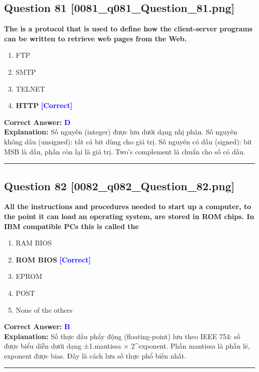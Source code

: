 \documentclass[11pt,a4paper]{article}
\begin{document}
\begin{minipage}{\textwidth}
\subsection*{Question 81 \quad \footnotesize{[0081\_q081\_Question\_81.png]}}
\noindent \textbf{The is a protocol that is used to define how the client-server programs can be written to retrieve web pages from the Web.}

\begin{enumerate}[label=\Alph*.]
    \item FTP
    \item SMTP
    \item TELNET
    \item \textbf{HTTP} \hfill \textcolor{blue}{\textbf{[Correct]}}
\end{enumerate}

\noindent \textbf{Correct Answer:} \textcolor{blue}{\textbf{D}} \\[2pt]
\noindent \textbf{Explanation:} Số nguyên (integer) được lưu dưới dạng nhị phân. Số nguyên không dấu (unsigned): tất cả bit dùng cho giá trị. Số nguyên có dấu (signed): bit MSB là dấu, phần còn lại là giá trị. Two's complement là chuẩn cho số có dấu.

\par\vspace{0.3cm}
\hrule
\vspace{0.3cm}
\end{minipage}

\begin{minipage}{\textwidth}
\subsection*{Question 82 \quad \footnotesize{[0082\_q082\_Question\_82.png]}}
\noindent \textbf{All the instructions and procedures needed to start up a computer, to the point it can load an operating system, are stored in ROM chips. In IBM compatible PCs this is called the}

\begin{enumerate}[label=\Alph*.]
    \item RAM BIOS
    \item \textbf{ROM BIOS} \hfill \textcolor{blue}{\textbf{[Correct]}}
    \item EPROM
    \item POST
    \item None of the others
\end{enumerate}

\noindent \textbf{Correct Answer:} \textcolor{blue}{\textbf{B}} \\[2pt]
\noindent \textbf{Explanation:} Số thực dấu phẩy động (floating-point) lưu theo IEEE 754: số được biểu diễn dưới dạng ±1.mantissa × 2\textasciicircum{}exponent. Phần mantissa là phần lẻ, exponent được bias. Đây là cách lưu số thực phổ biến nhất.

\par\vspace{0.3cm}
\hrule
\vspace{0.3cm}
\end{minipage}
\end{document}
